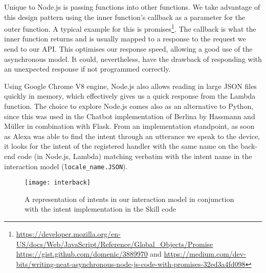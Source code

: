 Unique to Node.js is passing functions into other functions. We take advantage of %
this design pattern using the inner function's callback as a parameter for the outer function. A typical example for this is %
promises\footnote{\url{https://developer.mozilla.org/en-US/docs/Web/JavaScript/Reference/Global_Objects/Promise} \\ \url{https://gist.github.com/domenic/3889970} and \url{https://medium.com/dev-bits/writing-neat-asynchronous-node-js-code-with-promises-32ed3a4fd098}}. The callback is what the inner function returns and is usually mapped to a response to the request we send to our API.
This optimises our response speed, allowing a good use of the asynchronous model. It could, nevertheless, have the drawback of responding with an unexpected response if not programmed correctly.

Using Google Chrome V8 engine, Node.js also allows reading in large JSON files quickly in memory, which effectively gives us a quick response from the Lambda function.
The choice to explore Node.js comes also as an alternative to Python, since this was used in the Chatbot implementation of Berlina by Hassmann and Müller \cite{hassmannMlr:berlina} in combination with Flask.
From an implementation standpoint, as soon as Alexa was able to find the intent through an utterance we speak to the device, it looks for the intent of the registered handler with the same name on the back-end code (in Node.js, Lambda) matching verbatim with the intent name in the interaction model (\texttt{locale_name.JSON}).





\begin{figure}[h!]
	\centering
	\caption[Interaction Model vs. Skill Code]{A representation of intents in our interaction model in conjunction with the intent implementation in the Skill code}
	\label{interactionModel:bild2}
	\texttt{[image: interback]}
	
	
\end{figure}


